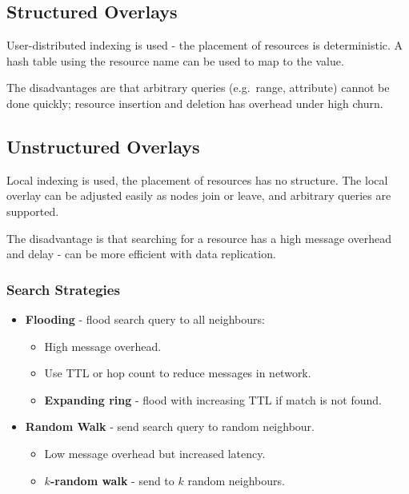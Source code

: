 \documentclass[11pt]{article}
\begin{document}
\subsection{Structured Overlays}
User-distributed indexing is used - the placement of resources is deterministic.
A hash table using the resource name can be used to map to the value.

The disadvantages are that arbitrary queries (e.g.\ range, attribute) cannot be done quickly; resource insertion and deletion has overhead under high churn.

\subsection{Unstructured Overlays}
Local indexing is used, the placement of resources has no structure.
The local overlay can be adjusted easily as nodes join or leave, and arbitrary queries are supported.

The disadvantage is that searching for a resource has a high message overhead and delay - can be more efficient with data replication.

\subsubsection{Search Strategies}
\begin{itemize}
  \item \textbf{Flooding} - flood search query to all neighbours:
    \begin{itemize}
      \item High message overhead.
      \item Use TTL or hop count to reduce messages in network.
      \item \textbf{Expanding ring} - flood with increasing TTL if match is not found.
      \end{itemize}
    \item \textbf{Random Walk} - send search query to random neighbour.
    \begin{itemize}
      \item Low message overhead but increased latency.
      \item \textbf{$k$-random walk} - send to $k$ random neighbours.
    \end{itemize}
\end{itemize}
\end{document}
